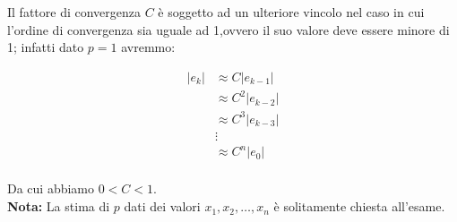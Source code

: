 \documentclass[12pt, a4paper]{book}
\theoremstyle{definition}
\begin{document}
\begin{flushleft}
Il fattore di convergenza $C$ è soggetto ad un ulteriore vincolo nel caso in cui l'ordine di convergenza sia uguale ad 1,ovvero il suo valore deve essere minore di 1; infatti dato $p=1$ avremmo:

\begin{equation}
	\begin{split}
		|e_{k}| & \approx C|e_{k-1}| \\
				  & \approx C^{2}|e_{k-2}| \\
				  & \approx C^{3}|e_{k-3}| \\
				  &  \vdots \\
				  &  \approx C^{n}|e_{0}| \\
	\end{split}
\end{equation}

Da cui abbiamo $0 < C < 1$.\\
\textbf{Nota:}  La stima di $p$ dati dei valori $x_{1}, x_{2},\dots, x_{n}$ è solitamente chiesta all'esame.
\end{flushleft}
\end{document}
